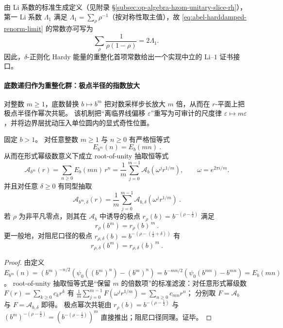 \begin{remark}[Li 系数的能量型读出]\label{rem:abel-harddamped-li1}
由 Li 系数的标准生成定义（见附录 \S\ref{subsec:op-algebra-hzom-unitary-slice-rh}），第一 Li 系数 \(\Lambda_1\) 满足
\(
\Lambda_1=\sum_\rho \rho^{-1}
\)（按对称性取主值），故 \eqref{eq:abel-harddamped-renorm-limit} 的常数亦可写为
\[
\sum_{\rho}\frac{1}{\rho(1-\rho)}=2\Lambda_1.
\]
因此，\(\delta\)-正则化 Hardy 能量的重整化首项常数给出一个实现中立的 Li--\(1\) 证书接口。
\end{remark}

\paragraph{底数递归作为重整化群：极点半径的指数放大}
对整数 \(m\ge 1\)，底数替换 \(b\mapsto b^m\) 把对数采样步长放大 \(m\) 倍，从而在 \(r\)-平面上把极点半径作幂次共轭。
该机制把“离临界线偏移 \(\varepsilon\)”重写为可审计的尺度律 \(\varepsilon\mapsto m\varepsilon\)，并将边界层扰动压入单位圆内的显式奇性位置。

\begin{proposition}[底数递归恒等式与极点半径的幂次共轭]\label{prop:abel-base-recursion-pole-conjugacy}
固定 \(b>1\)。
对任意整数 \(m\ge 1\) 与 \(n\ge 0\) 有严格恒等式
\[
\boxed{\ E_{b^m}(n)=E_b(mn)\ }.
\]
从而在形式幂级数意义下成立 root-of-unity 抽取恒等式
\[
\boxed{\ \mathcal A_{b^m}(r)=\sum_{n\ge 0}E_b(mn)\,r^n
=\frac{1}{m}\sum_{j=0}^{m-1}\mathcal A_b\!\left(\omega^j r^{1/m}\right),\qquad \omega=e^{2\pi i/m}. }
\]
并且对任意 \(\delta\ge 0\) 有同型抽取
\[
\boxed{\ \mathcal A_{b^m,\delta}(r)
=\frac{1}{m}\sum_{j=0}^{m-1}\mathcal A_{b,\delta}\!\left(\omega^j r^{1/m}\right)\ }.
\]
若 \(\rho\) 为非平凡零点，则其在 \(\mathcal A_b\) 中诱导的极点 \(r_\rho(b)=b^{-(\rho-\frac12)}\) 满足
\[
\boxed{\ r_\rho(b^m)=r_\rho(b)^{\,m}\ }.
\]
更一般地，对阻尼口径的极点 \(r_{\rho,\delta}(b)=b^{-(\rho-(\frac12+\delta))}\) 有
\[
\boxed{\ r_{\rho,\delta}(b^m)=r_{\rho,\delta}(b)^{\,m}\ }.
\]
\end{proposition}
\begin{proof}
由定义 \(E_{b^m}(n)=(b^m)^{-n/2}(\psi_0((b^m)^n)-(b^m)^n)=b^{-mn/2}(\psi_0(b^{mn})-b^{mn})=E_b(mn)\)。
root-of-unity 抽取恒等式是“保留 \(m\) 的倍数项”的标准滤波：对任意形式幂级数 \(F(r)=\sum_{k\ge 0}c_k r^k\) 有
\(
\frac1m\sum_{j=0}^{m-1}F(\omega^j r^{1/m})=\sum_{n\ge 0}c_{mn}r^n
\)；
分别取 \(F=\mathcal A_b\) 与 \(F=\mathcal A_{b,\delta}\) 即得。
极点幂次共轭由 \(r_\rho(b)=b^{-(\rho-\frac12)}\) 与 \((b^m)^{-(\rho-\frac12)}=(b^{-(\rho-\frac12)})^m\) 直接推出；阻尼口径同理。证毕。
\end{proof}

